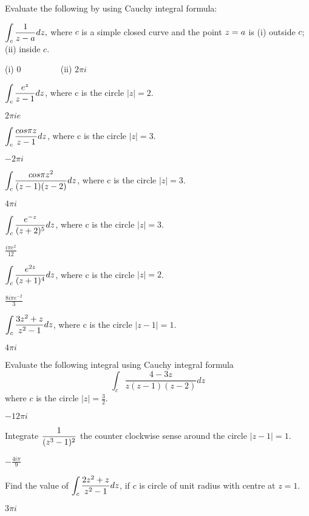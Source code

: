 \begin{problems}
\prob Evaluate the following by using Cauchy integral formula:

\subprob $\displaystyle \int_{c}\frac{1}{z-a}dz,$ where $c$ is a simple closed curve and
the point $\displaystyle z = a$ is  (i) outside $c$; (ii) inside $c$. 
\begin{sol}
(i) 0	~~~~~~~~ (ii) $2\pi i$
\end{sol}
\subprob  $\displaystyle \int_{c}\frac{e^{z}}{z-1}dz$, where c is the circle $|z| =2$.
\begin{sol}
$2\pi i e$
\end{sol}
\subprob $\displaystyle \int_{c}\frac{cos\pi z}{z-1}dz$, where c is the circle $|z|=3$.
\begin{sol}
$-2\pi i$
\end{sol}
\subprob $\displaystyle \int_{c}\frac{cos\pi z^{2}}{(z-1)(z-2)}dz$, where c is the circle $|z| = 3$. 
\begin{sol}
$4\pi i $
\end{sol}
\subprob $\displaystyle \int_{c}\frac{e^{-z}}{(z+2)^{5}}dz$, where c is the circle $|z|=3$. 
\begin{sol}
$\frac{i\pi e^2}{12}$
\end{sol}
\subprob $\displaystyle \int_{c}\frac{e^{2z}}{(z+1)^{4}}dz$, where c is the circle $|z|= 2$. 
\begin{sol}
$\frac{8 i \pi e^{-2}}{3}$
\end{sol}
\subprob $\displaystyle \int_{c}\frac{3z^{2}+z}{z^{2}-1}dz$, where c is the circle $|z-1|=1$.
\begin{sol}
$4 \pi i$
\end{sol}
\prob Evaluate the following integral using Cauchy integral formula 
\[\int_{c}\frac{4-3z}{z(z-1)(z-2)}dz\]
where $c$ is the circle $|z| =\frac{3}{2}$.
\begin{sol}
$-12 \pi i$
\end{sol}
\prob Integrate $\displaystyle  \frac{1}{(z^{3}-1)^{2}}$ the counter clockwise sense around the circle $|z-1|=1$.
\begin{sol}
$-\frac{4i\pi}{9}$
\end{sol}
\prob Find the value of $\displaystyle \int_{c}\frac{2z^{2}+z}{z^{2}-1}dz$, if $c$ is circle of unit radius with centre at $z = 1$.
\begin{sol}
$3\pi i$
\end{sol}

\end{problems}